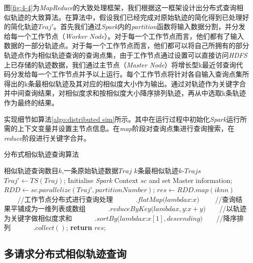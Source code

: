 图\ref{fig:4-4}为\emph{MapReduce}的大致处理框架，我们根据这一框架设计出分布式查询相似轨迹的大致算法。在算法中，假设我们已经完成对原始轨迹的简化得到已处理好的简化轨迹$Traj'$。首先我们通过\emph{Spark}内的\emph{partition}函数将输入数据分割，并分发给每一个工作节点（\emph{Worker Node}）。对于每一个工作节点而言，他们都有了输入数据的一部分轨迹点。对于每一个工作节点而言，他们都可以将自己所拥有的部分轨迹点作为相似轨迹查询的查询点集，由于工作节点通过设置可以直接访问\emph{HDFS}上已存储的轨迹数据，我们通过主节点（\emph{Master Node}）将增长型k最近邻查询代码分发给每一个工作节点并予以上运行。每个工作节点将针对各自输入查询点集所得出的k条最相似轨迹及其对应的相似度大小作为输出。通过对轨迹作为关键字合并中间查询结果，对相似度求和按相似度大小降序排列轨迹，再从中选取k条轨迹作为最终的结果。

实现细节如算法\ref{algo:distributed sim}所示。其中在运行过程中初始化\emph{Spark}运行所需的上下文变量并设置主节点信息。在\emph{map}阶段对查询点集进行查询搜索，在\emph{reduce}阶段进行关键字合并。

\begin{algorithm}
\caption{分布式相似轨迹查询算法}
\label{algo:distributed sim}
\begin{algorithmic}[1] %
\Require 相似轨迹查询数目$k$,一条原始轨迹数据$Traj$%
\Ensure $k$条最相似轨迹$k$-$Trajs$ %
\State $Traj' \gets TS(Traj)$;
\State Initialise \emph{Spark} Context $sc$ and set Master information;
\State $RDD \gets sc.parallelize(Traj', partitionNumber)$;
\State $res \gets RDD.map(iknn) $ $\qquad$//工作节点分布式进行查询处理
\State $\qquad\quad.flatMap(lambda x$:$x)$ $\qquad$//查询结果平铺成为一维列表或数组
\State $\qquad\quad.reduceByKey(lambda x,y$:$x+y)$$\qquad$//以轨迹为关键字做相似度求和
\State $\quad\qquad.sortBy(lambda x$:$x[1], descending)$$\qquad$//降序排列
\State $\quad\qquad.collect()$;
\State \textbf{return} $res$; 
\end{algorithmic}
\end{algorithm}


\subsection{多请求分布式相似轨迹查询}
\label{subsec:distributed multiple}